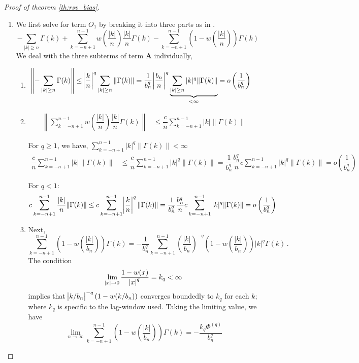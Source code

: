 \documentclass[11pt]{article}
\theoremstyle{remark}
\begin{document}
\begin{proof}[Proof of theorem \ref{th:rsv_bias}]
\begin{enumerate}
\item We first solve for term $O_1$ by breaking it into three parts as in \cite{hannan2009multiple}.
\[
-\sum_{|k|\geq n}\Gamma(k) + \sum_{k = -n+1}^{n-1}w\left(\dfrac{|k|}{n}\right)\dfrac{|k|}{n}\Gamma(k)- \sum_{k = -n+1}^{n-1}\left(1-w\left(\dfrac{|k|}{n}\right)\right)\Gamma(k)
\]
%
We deal with the three subterms of term \textbf{A} individually,
\begin{enumerate}
    \item 
    \begin{align*}
        \left\|{-\sum_{|k|\geq n}\Gamma(k)}\right\| &\leq   \abs{\dfrac{k}{n}}^q\sum_{|k|\geq n}\|\Gamma(k)\| = \dfrac{1}{b_n^q}\abs{\dfrac{b_n}{n}}^q\underbrace{\sum_{|k|\geq n}|k|^q\|\Gamma(k)\|}_{<\infty} = o\left(\dfrac{1}{b_n^q}\right)
    \end{align*}
    
    \item
\begin{align*}
   \left\| \sum_{k = -n+1}^{n-1}w\left(\dfrac{|k|}{n}\right)\dfrac{|k|}{n}\Gamma(k)\right\| &\leq \dfrac{c}{n}\sum_{k = -n+1}^{n-1}|k|\|\Gamma(k)\| 
\end{align*}
 
For $q \geq 1$, we have, $\sum_{k=-n+1}^{n-1}|k|^q\|\Gamma(k)\| < \infty$
   \begin{align*}
       \dfrac{c}{n}\sum_{k = -n+1}^{n-1}|k|\|\Gamma(k)\| &\leq \dfrac{c}{n}\sum_{k = -n+1}^{n-1}|k|^q\|\Gamma(k)\| = \dfrac{1}{b_n^q}\dfrac{b_n^q}{n}c\sum_{k = -n+1}^{n-1}|k|^q\|\Gamma(k)\| = o\left(\dfrac{1}{b_n^q}\right) 
   \end{align*}
          
For $q <1$:
   \begin{align*}
       c\sum_{k =-n+1}^{n-1}\dfrac{|k|}{n}\|\Gamma(k)\| &\leq c\sum_{k =-n+1}^{n-1}\abs{\dfrac{k}{n}}^q\|\Gamma(k)\| = \dfrac{1}{b_n^q}\dfrac{b_n^q}{n}c\sum_{k =-n+1}^{n-1}|k|^q\|\Gamma(k)\| = o\left(\dfrac{1}{b_n^q}\right) 
   \end{align*}

  \item Next,
     \[
     \sum_{k = -n+1}^{n-1}\left(1-w\left(\dfrac{|k|}{b_n}\right)\right)\Gamma(k) = -\dfrac{1}{b_n^q}\sum_{k = -n+1}^{n-1}  \left(\dfrac{|k|}{b_n}\right)^{-q} {\left(1-w\left(\dfrac{|k|}{b_n}\right)\right)}|k|^q \Gamma(k)\,.
     \]
%     
     The condition 
     \[
     \lim_{\abs{x}\to 0}\dfrac{1 - w(x)}{\abs{x}^q} = k_q < \infty
     \]
     implies that $\abs{k/b_n}^{-q}(1-w(k/b_n))$ converges boundedly to $k_q$ for each $k$; where $k_q$ is specific to the lag-window used. Taking the limiting value, we have
     \[
     \lim_{n \to \infty}\sum_{k = -n+1}^{n-1}\left(1-w\left(\dfrac{|k|}{b_n}\right)\right)\Gamma(k) = -\dfrac{k_q \Phi^{(q)}}{b_n^q}
     \]
\end{enumerate}


\end{enumerate}
\end{proof}
\end{document}
